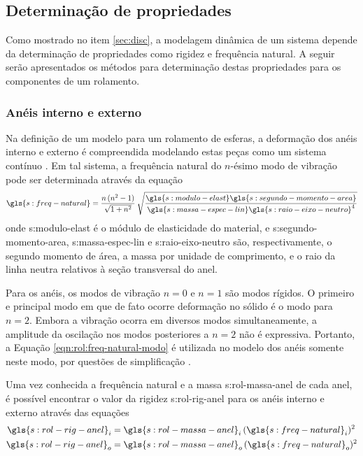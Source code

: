 \documentclass[12pt,oneside,english,brazil,lmodern,siglas,simbolos,cite=num]{ucsmonograph}
\begin{document}
	\subsection{Determinação de propriedades}
	Como mostrado no item \ref{sec:disc}, a modelagem dinâmica de um sistema depende da determinação de propriedades como rigidez e frequência natural.
	A seguir serão apresentados os métodos para determinação destas propriedades para os componentes de um rolamento.
	
	\subsubsection{Anéis interno e externo} \label{sec:props-aneis}
	Na definição de um modelo para um rolamento de esferas, a deformação dos anéis interno e externo é compreendida modelando estas peças como um sistema contínuo \cite{sassi:2007}.
	Em tal sistema, a frequência natural do $n$-ésimo modo de vibração pode ser determinada através da equação \cite{tandon:1997,sassi:2007,cong:2013}
	\begin{equation} \label{eqn:rol:freq-natural-modo}
		\gls{s:freq-natural} = \frac{n\,(n^2-1)}{\sqrt{1+n^2}}\:
		\sqrt{\frac{\gls{s:modulo-elast}\gls{s:segundo-momento-area}}{
		\gls{s:massa-espec-lin}\gls{s:raio-eixo-neutro}^4}}
	\end{equation}
	onde \gls{s:modulo-elast} é o módulo de elasticidade do material, e \gls{s:segundo-momento-area}, \gls{s:massa-espec-lin} e \gls{s:raio-eixo-neutro} são, respectivamente, o segundo momento de área, a massa por unidade de comprimento, e o raio da linha neutra relativos à seção transversal do anel.
	
	Para os anéis, os modos de vibração $n=0$ e $n=1$ são modos rígidos.
	O primeiro e principal modo em que de fato ocorre deformação no sólido é o modo para $n=2$.
	Embora a vibração ocorra em diversos modos simultaneamente, a amplitude da oscilação nos modos posteriores a $n=2$ não é expressiva.
	Portanto, a Equação \ref{eqn:rol:freq-natural-modo} é utilizada no modelo dos anéis somente neste modo, por questões de simplificação \cite{sassi:2007}.
	
	Uma vez conhecida a frequência natural e a massa \gls{s:rol-massa-anel} de cada anel, é possível encontrar o valor da rigidez \gls{s:rol-rig-anel} para os anéis interno e externo através das equações \cite{sassi:2007}
	\begin{align}
		\gls{s:rol-rig-anel}_i &= \gls{s:rol-massa-anel}_i\,
			(\gls{s:freq-natural}_i)^2 \label{eqn:rol:rig-anel-int}\\
		\gls{s:rol-rig-anel}_o &= \gls{s:rol-massa-anel}_o\,
			(\gls{s:freq-natural}_o)^2 \label{eqn:rol:rig-anel-ext}
	\end{align}
	
\end{document}
